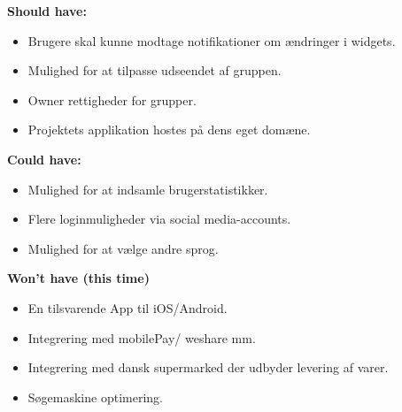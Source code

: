 \noindent \textbf{Should have:}
\begin{itemize}
    \item Brugere skal kunne modtage notifikationer om ændringer i widgets.
    \item Mulighed for at tilpasse udseendet af gruppen.
    \item Owner rettigheder for grupper.
    \item Projektets applikation hostes på dens eget domæne.
\end{itemize}

\noindent \textbf{Could have:}
\begin{itemize}
    \item Mulighed for at indsamle brugerstatistikker.
    \item Flere loginmuligheder via social media-accounts.
    \item Mulighed for at vælge andre sprog.
\end{itemize}

\noindent \textbf{Won't have (this time)}
\begin{itemize}
    \item En tilsvarende App til iOS/Android.
    \item Integrering med mobilePay/ weshare mm.
    \item Integrering med dansk supermarked der udbyder levering af varer.
    \item Søgemaskine optimering.
\end{itemize}

